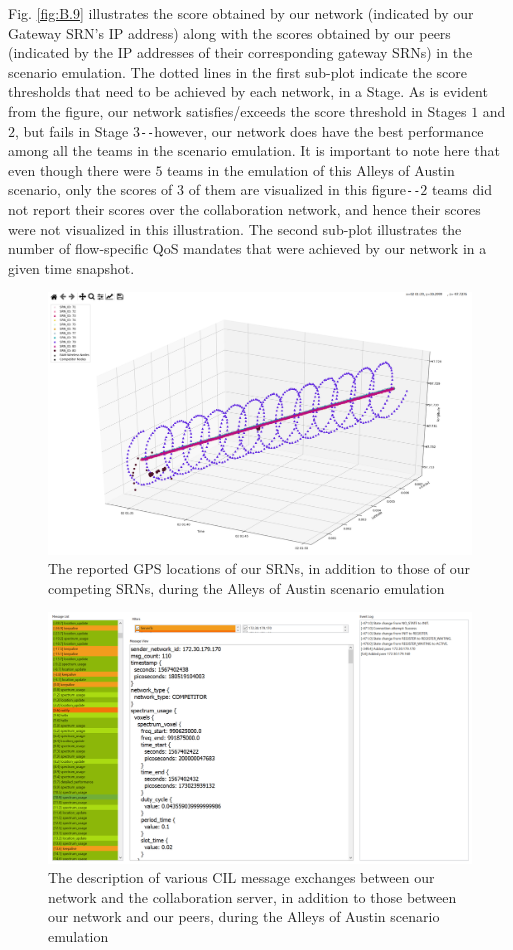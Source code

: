 Fig. \ref{fig:B.9} illustrates the score obtained by our network (indicated by our Gateway SRN's IP address) along with the scores obtained by our peers (indicated by the IP addresses of their corresponding gateway SRNs) in the scenario emulation. The dotted lines in the first sub-plot indicate the score thresholds that need to be achieved by each network, in a Stage. As is evident from the figure, our network satisfies/exceeds the score threshold in Stages $1$ and $2$, but fails in Stage $3$\texttt{-{}-}however, our network does have the best performance among all the teams in the scenario emulation. It is important to note here that even though there were $5$ teams in the emulation of this Alleys of Austin scenario, only the scores of $3$ of them are visualized in this figure\texttt{-{}-}$2$ teams did not report their scores over the collaboration network, and hence their scores were not visualized in this illustration. The second sub-plot illustrates the number of flow-specific QoS mandates that were achieved by our network in a given time snapshot.
\begin{figure} [htb]
    \centerline{
    \includegraphics[width = 1.0\textwidth]{Alleys_GPS.PNG}}
    \caption{The reported GPS locations of our SRNs, in addition to those of our competing SRNs, during the Alleys of Austin scenario emulation}
    \label{fig:B.10}
\end{figure}
\begin{figure} [htb]
    \centerline{
    \includegraphics[width = 1.0\textwidth]{Alleys_Collab.PNG}}
    \caption{The description of various CIL message exchanges between our network and the collaboration server, in addition to those between our network and our peers, during the Alleys of Austin scenario emulation}
    \label{fig:B.11}
\end{figure}
